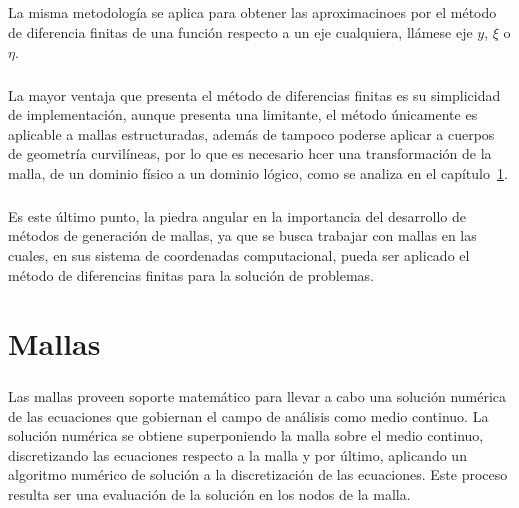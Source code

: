 \documentclass[letterpaper, openright, 12pt]{book}
\begin{document}
    \paragraph*{}
    La misma metodología se aplica para obtener las aproximacinoes por el método
    de diferencia finitas de una función respecto a un eje cualquiera, llámese
    eje $y$, $\xi$ o $\eta$.

    \paragraph*{}
    La mayor ventaja que presenta el método de diferencias finitas es su
    simplicidad de implementación, aunque presenta una limitante, el método
    únicamente es aplicable a mallas estructuradas, además de tampoco poderse
    aplicar a cuerpos de geometría curvilíneas, por lo que es necesario hcer una
    transformación de la malla, de un dominio físico a un dominio lógico, como
    se analiza en el capítulo~\ref{chap:mallas}.

    \paragraph*{}
    Es este último punto, la piedra angular en la importancia del desarrollo de
    métodos de generación de mallas, ya que se busca trabajar con mallas en las
    cuales, en sus sistema de coordenadas computacional, pueda ser aplicado el
    método de diferencias finitas para la solución de problemas.

    \chapter{Mallas}
    \label{chap:mallas}
    \paragraph*{}
    Las mallas proveen soporte matemático para llevar a cabo una solución
    numérica de las ecuaciones que gobiernan el campo de análisis como medio
    continuo. La solución numérica se obtiene superponiendo la malla sobre el
    medio continuo, discretizando las ecuaciones respecto a la malla y por
    último, aplicando un algoritmo numérico de solución a la discretización de
    las ecuaciones. Este proceso resulta ser una evaluación de la solución en
    los nodos de la malla.
\end{document}

